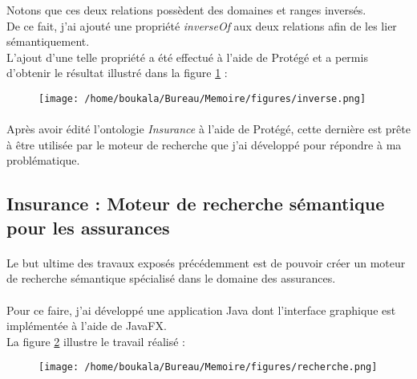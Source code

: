 \documentclass[12pt, a4paper, oneside]{book}
\begin{document}
Notons que ces deux relations possèdent des domaines et ranges inversés.\\

De ce fait, j'ai ajouté une propriété \emph{inverseOf} aux deux relations afin de les lier sémantiquement.\\
L'ajout d'une telle propriété a été effectué à l'aide de Protégé et a permis d'obtenir le résultat illustré dans la figure \ref{inverse} : 

\begin{figure}[h!]
\begin{center}
\texttt{[image: /home/boukala/Bureau/Memoire/figures/inverse.png]}
\label{inverse}
\end{center}
\end{figure}
\paragraph{}
Après avoir édité l'ontologie \emph{Insurance} à l'aide de Protégé, cette dernière est prête à être utilisée par le moteur de recherche que j'ai développé pour répondre à ma problématique.


\subsection{Insurance : Moteur de recherche sémantique pour les assurances}

\paragraph{}

Le but ultime des travaux exposés précédemment est de pouvoir créer un moteur de recherche sémantique spécialisé dans le domaine des assurances. 

\paragraph{}

Pour ce faire, j'ai développé une application Java dont l'interface graphique est implémentée à l'aide de JavaFX.\\

La figure \ref{recherche} illustre le travail réalisé : 

\begin{figure}[h!]
\begin{center}
\texttt{[image: /home/boukala/Bureau/Memoire/figures/recherche.png]}
\label{recherche}
\end{center}
\end{figure}
\end{document}
